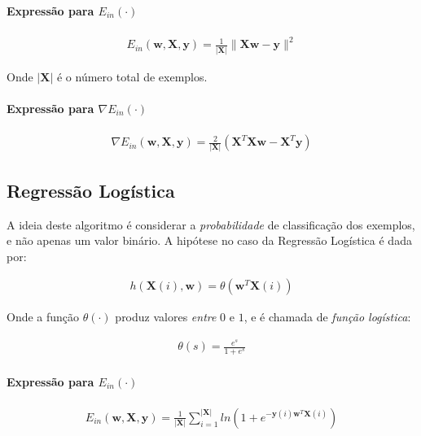 \documentclass[a4paper, 12pt]{article}
\begin{document}
\paragraph{Expressão para $E_{in}(\cdot)$}

\begin{align*}
    E_{in}(\textbf{w}, \textbf{X}, \textbf{y}) = \frac{1}{|\textbf{X}|} \|\textbf{Xw} - \textbf{y}\|^{2}
\end{align*}

Onde $|\textbf{X}|$ é o número total de exemplos.

\paragraph{Expressão para $\nabla{}E_{in}(\cdot)$}

\begin{align*}
    \nabla{}E_{in}(\textbf{w}, \textbf{X}, \textbf{y}) = \frac{2}{|\textbf{X}|} (\textbf{X}^{T}\textbf{Xw} - \textbf{X}^{T}\textbf{y})
\end{align*}

\subsection{Regressão Logística}

A ideia deste algoritmo é considerar a \textit{probabilidade} de classificação
dos exemplos, e não apenas um valor binário. A hipótese no caso da Regressão
Logística é dada por:

\begin{align*}
    h(\textbf{X}(i),\textbf{w}) = \theta(\textbf{w}^{T}\textbf{X}(i))
\end{align*}

Onde a função $\theta(\cdot)$ produz valores \textit{entre} $0$ e $1$, e é
chamada de \textit{função logística}:

\begin{align*}
    \theta(s) = \frac{e^{s}}{1 + e^{s}}
\end{align*}

\paragraph{Expressão para $E_{in}(\cdot)$}

\begin{align*}
    E_{in}(\textbf{w}, \textbf{X}, \textbf{y}) = \frac{1}{|\textbf{X}|} \sum^{|\textbf{X}|}_{i=1}{ln(1 + e^{-\textbf{y}(i)\textbf{w}^{T}\textbf{X}(i)})}
\end{align*}
\end{document}
